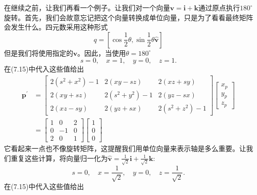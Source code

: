 在继续之前，让我们再看一个例子。让我们对一个向量$\mathbf{v}=\mathbf{i}+\mathbf{k}$通过原点执行$180^{\circ}$旋转。首先，我们会故意忘记把这个向量转换成单位向量，只是为了看看最终矩阵会发生什么。四元数采用这种形式
$$
q=\left[\cos \frac{1}{2} \theta, \sin \frac{1}{2} \theta \hat{\mathbf{v}}\right]
$$
但是我们将使用指定的$\mathbf{v}$。因此，当使用$\theta=180^{\circ}$
$$
s=0, \quad x=1, \quad y=0, \quad z=1 .
$$
在(7.15)中代入这些值给出
$$
\begin{aligned}
\mathbf{p}^{\prime} & =\left[\begin{array}{ccc}
2\left(s^{2}+x^{2}\right)-1 & 2(x y-s z) & 2(x z+s y) \\
2(x y+s z) & 2\left(s^{2}+y^{2}\right)-1 & 2(y z-s x) \\
2(x z-s y) & 2(y z+s x) & 2\left(s^{2}+z^{2}\right)-1
\end{array}\right]\left[\begin{array}{l}
x_{p} \\
y_{p} \\
z_{p}
\end{array}\right] \\
& =\left[\begin{array}{ccc}
1 & 0 & 2 \\
0 & -1 & 0 \\
2 & 0 & 1
\end{array}\right]\left[\begin{array}{l}
1 \\
0 \\
0
\end{array}\right]
\end{aligned}
$$
它看起来一点也不像旋转矩阵，这提醒我们用单位向量来表示轴是多么重要。让我们重复这些计算，将向量归一化为$\hat{\mathbf{v}}=\frac{1}{\sqrt{2}} \mathbf{i}+\frac{1}{\sqrt{2}} \mathbf{k}$:
$$
s=0, \quad x=\frac{1}{\sqrt{2}}, \quad y=0, \quad z=\frac{1}{\sqrt{2}} .
$$
在(7.15)中代入这些值给出
